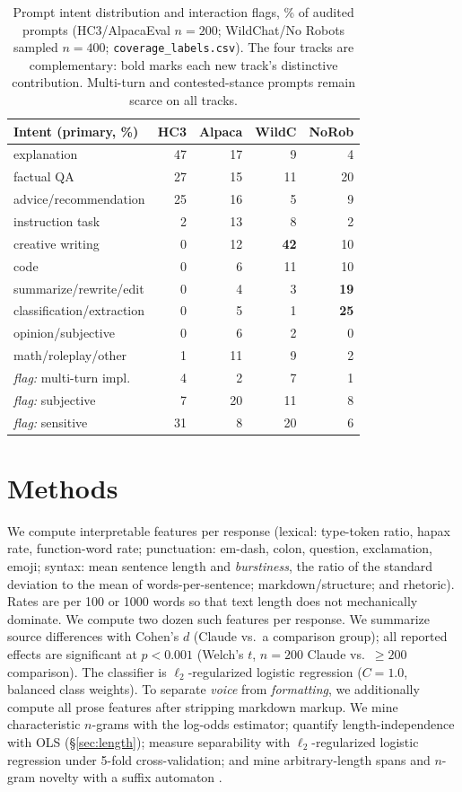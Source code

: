 \documentclass[11pt]{article}
\begin{document}
\begin{table}[t]
\centering\small
\setlength{\tabcolsep}{4pt}
\begin{tabular}{@{}lrrrr@{}}
\toprule
Intent (primary, \%) & HC3 & Alpaca & WildC & NoRob \\
\midrule
explanation & 47 & 17 & 9 & 4 \\
factual QA & 27 & 15 & 11 & 20 \\
advice/recommendation & 25 & 16 & 5 & 9 \\
instruction task & 2 & 13 & 8 & 2 \\
creative writing & 0 & 12 & \textbf{42} & 10 \\
code & 0 & 6 & 11 & 10 \\
summarize/rewrite/edit & 0 & 4 & 3 & \textbf{19} \\
classification/extraction & 0 & 5 & 1 & \textbf{25} \\
opinion/subjective & 0 & 6 & 2 & 0 \\
math/roleplay/other & 1 & 11 & 9 & 2 \\
\midrule
\emph{flag:} multi-turn impl.\ & 4 & 2 & 7 & 1 \\
\emph{flag:} subjective & 7 & 20 & 11 & 8 \\
\emph{flag:} sensitive & 31 & 8 & 20 & 6 \\
\bottomrule
\end{tabular}
\caption{Prompt intent distribution and interaction flags, \% of audited prompts
(HC3/AlpacaEval $n{=}200$; WildChat/No Robots sampled $n{=}400$;
\texttt{coverage\_labels.csv}). The four tracks are complementary: bold marks each
new track's distinctive contribution. Multi-turn and contested-stance prompts
remain scarce on all tracks.}
\label{tab:coverage}
\end{table}

\section{Methods}
We compute interpretable features per response (lexical: type-token ratio,
hapax rate, function-word rate; punctuation: em-dash, colon, question,
exclamation, emoji; syntax: mean sentence length and \emph{burstiness}, the
ratio of the standard deviation to the mean of words-per-sentence;
markdown/structure; and rhetoric). Rates are per 100 or 1000 words so that text
length does not mechanically dominate. We compute two dozen such features per response. We summarize source differences
with Cohen's $d$ (Claude vs.\ a comparison group); all reported effects are
significant at $p<0.001$ (Welch's $t$, $n{=}200$ Claude vs.\ ${\ge}200$
comparison). The classifier is $\ell_2$-regularized logistic regression
($C{=}1.0$, balanced class weights). To separate \emph{voice} from
\emph{formatting}, we additionally compute all prose features after stripping
markdown markup. We mine characteristic $n$-grams with the
\citet{monroe2008fightin} log-odds estimator; quantify length-independence with
OLS (\S\ref{sec:length}); measure separability with $\ell_2$-regularized logistic
regression under 5-fold cross-validation; and mine arbitrary-length spans and
$n$-gram novelty with a suffix automaton \citep{merrill2024rustydawg}.
\end{document}
